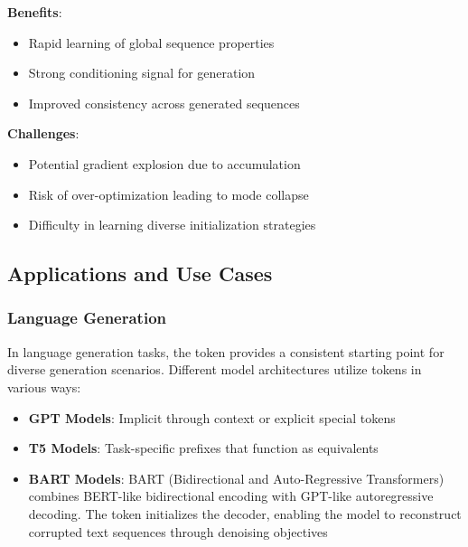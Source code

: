 \textbf{Benefits}:
\begin{itemize}
\item Rapid learning of global sequence properties
\item Strong conditioning signal for generation
\item Improved consistency across generated sequences
\end{itemize}

\textbf{Challenges}:
\begin{itemize}
\item Potential gradient explosion due to accumulation
\item Risk of over-optimization leading to mode collapse
\item Difficulty in learning diverse initialization strategies
\end{itemize}

\subsection{Applications and Use Cases}

\subsubsection{Language Generation}

In language generation tasks, the \sos{} token provides a consistent starting point for diverse generation scenarios. Different model architectures utilize \sos{} tokens in various ways:

\begin{itemize}
\item \textbf{GPT Models}: Implicit \sos{} through context or explicit special tokens
\item \textbf{T5 Models}: Task-specific prefixes that function as \sos{} equivalents
\item \textbf{BART Models}: BART (Bidirectional and Auto-Regressive Transformers) \citep{lewis2019bart} combines BERT-like bidirectional encoding with GPT-like autoregressive decoding. The \sos{} token initializes the decoder, enabling the model to reconstruct corrupted text sequences through denoising objectives
\end{itemize}

